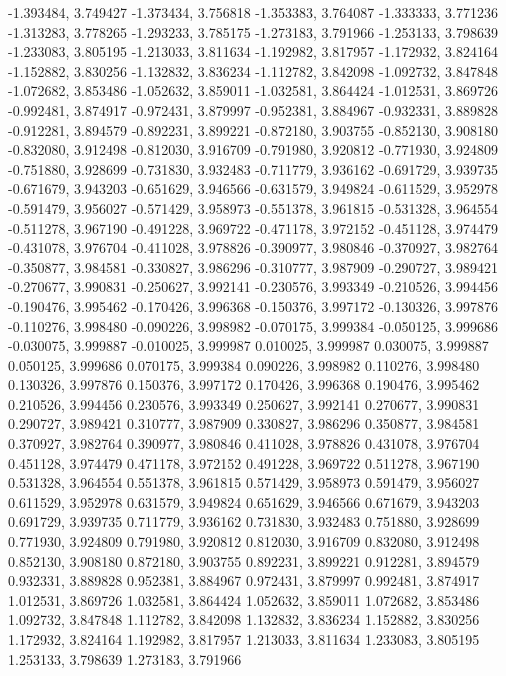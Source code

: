 -1.393484, 3.749427
-1.373434, 3.756818
-1.353383, 3.764087
-1.333333, 3.771236
-1.313283, 3.778265
-1.293233, 3.785175
-1.273183, 3.791966
-1.253133, 3.798639
-1.233083, 3.805195
-1.213033, 3.811634
-1.192982, 3.817957
-1.172932, 3.824164
-1.152882, 3.830256
-1.132832, 3.836234
-1.112782, 3.842098
-1.092732, 3.847848
-1.072682, 3.853486
-1.052632, 3.859011
-1.032581, 3.864424
-1.012531, 3.869726
-0.992481, 3.874917
-0.972431, 3.879997
-0.952381, 3.884967
-0.932331, 3.889828
-0.912281, 3.894579
-0.892231, 3.899221
-0.872180, 3.903755
-0.852130, 3.908180
-0.832080, 3.912498
-0.812030, 3.916709
-0.791980, 3.920812
-0.771930, 3.924809
-0.751880, 3.928699
-0.731830, 3.932483
-0.711779, 3.936162
-0.691729, 3.939735
-0.671679, 3.943203
-0.651629, 3.946566
-0.631579, 3.949824
-0.611529, 3.952978
-0.591479, 3.956027
-0.571429, 3.958973
-0.551378, 3.961815
-0.531328, 3.964554
-0.511278, 3.967190
-0.491228, 3.969722
-0.471178, 3.972152
-0.451128, 3.974479
-0.431078, 3.976704
-0.411028, 3.978826
-0.390977, 3.980846
-0.370927, 3.982764
-0.350877, 3.984581
-0.330827, 3.986296
-0.310777, 3.987909
-0.290727, 3.989421
-0.270677, 3.990831
-0.250627, 3.992141
-0.230576, 3.993349
-0.210526, 3.994456
-0.190476, 3.995462
-0.170426, 3.996368
-0.150376, 3.997172
-0.130326, 3.997876
-0.110276, 3.998480
-0.090226, 3.998982
-0.070175, 3.999384
-0.050125, 3.999686
-0.030075, 3.999887
-0.010025, 3.999987
0.010025, 3.999987
0.030075, 3.999887
0.050125, 3.999686
0.070175, 3.999384
0.090226, 3.998982
0.110276, 3.998480
0.130326, 3.997876
0.150376, 3.997172
0.170426, 3.996368
0.190476, 3.995462
0.210526, 3.994456
0.230576, 3.993349
0.250627, 3.992141
0.270677, 3.990831
0.290727, 3.989421
0.310777, 3.987909
0.330827, 3.986296
0.350877, 3.984581
0.370927, 3.982764
0.390977, 3.980846
0.411028, 3.978826
0.431078, 3.976704
0.451128, 3.974479
0.471178, 3.972152
0.491228, 3.969722
0.511278, 3.967190
0.531328, 3.964554
0.551378, 3.961815
0.571429, 3.958973
0.591479, 3.956027
0.611529, 3.952978
0.631579, 3.949824
0.651629, 3.946566
0.671679, 3.943203
0.691729, 3.939735
0.711779, 3.936162
0.731830, 3.932483
0.751880, 3.928699
0.771930, 3.924809
0.791980, 3.920812
0.812030, 3.916709
0.832080, 3.912498
0.852130, 3.908180
0.872180, 3.903755
0.892231, 3.899221
0.912281, 3.894579
0.932331, 3.889828
0.952381, 3.884967
0.972431, 3.879997
0.992481, 3.874917
1.012531, 3.869726
1.032581, 3.864424
1.052632, 3.859011
1.072682, 3.853486
1.092732, 3.847848
1.112782, 3.842098
1.132832, 3.836234
1.152882, 3.830256
1.172932, 3.824164
1.192982, 3.817957
1.213033, 3.811634
1.233083, 3.805195
1.253133, 3.798639
1.273183, 3.791966
